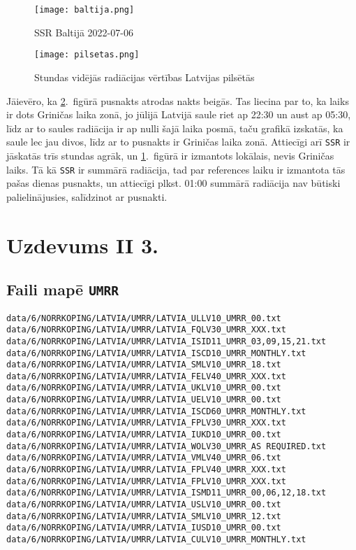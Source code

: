 \documentclass[12pt,a4paper]{article}
\begin{document}
\begin{figure}[ht!]
    \centering
    \texttt{[image: baltija.png]}
    \caption{SSR Baltijā 2022-07-06}
    \label{baltija}
\end{figure}
\begin{figure}[ht!]
    \centering
    \texttt{[image: pilsetas.png]}
    \caption{Stundas vidējās radiācijas vērtības Latvijas pilsētās}
    \label{pilsetas}
\end{figure}
Jāievēro, ka \ref{pilsetas}.~figūrā pusnakts atrodas nakts beigās. Tas liecina par to, ka laiks ir dots Griničas laika zonā, jo jūlijā Latvijā saule riet ap 22:30 un aust ap 05:30, līdz ar to saules radiācija ir ap nulli šajā laika posmā, taču grafikā izskatās, ka saule lec jau divos, līdz ar to pusnakts ir Griničas laika zonā. Attiecīgi arī \texttt{SSR} ir jāskatās trīs stundas agrāk, un \ref{baltija}.~figūrā ir izmantots lokālais, nevis Griničas laiks. Tā kā \texttt{SSR} ir summārā radiācija, tad par references laiku ir izmantota tās pašas dienas pusnakts, un attiecīgi plkst. 01:00 summārā radiācija nav būtiski palielinājusies, salīdzinot ar pusnakti.


\newpage
\appendix
\section{Uzdevums II 3.}\label{ap:II 3}
\subsection*{Faili mapē \texttt{UMRR}}
\begin{lstlisting}[breaklines]
data/6/NORRKOPING/LATVIA/UMRR/LATVIA_ULLV10_UMRR_00.txt
data/6/NORRKOPING/LATVIA/UMRR/LATVIA_FQLV30_UMRR_XXX.txt
data/6/NORRKOPING/LATVIA/UMRR/LATVIA_ISID11_UMRR_03,09,15,21.txt
data/6/NORRKOPING/LATVIA/UMRR/LATVIA_ISCD10_UMRR_MONTHLY.txt
data/6/NORRKOPING/LATVIA/UMRR/LATVIA_SMLV10_UMRR_18.txt
data/6/NORRKOPING/LATVIA/UMRR/LATVIA_FELV40_UMRR_XXX.txt
data/6/NORRKOPING/LATVIA/UMRR/LATVIA_UKLV10_UMRR_00.txt
data/6/NORRKOPING/LATVIA/UMRR/LATVIA_UELV10_UMRR_00.txt
data/6/NORRKOPING/LATVIA/UMRR/LATVIA_ISCD60_UMRR_MONTHLY.txt
data/6/NORRKOPING/LATVIA/UMRR/LATVIA_FPLV30_UMRR_XXX.txt
data/6/NORRKOPING/LATVIA/UMRR/LATVIA_IUKD10_UMRR_00.txt
data/6/NORRKOPING/LATVIA/UMRR/LATVIA_WOLV30_UMRR_AS REQUIRED.txt
data/6/NORRKOPING/LATVIA/UMRR/LATVIA_VMLV40_UMRR_06.txt
data/6/NORRKOPING/LATVIA/UMRR/LATVIA_FPLV40_UMRR_XXX.txt
data/6/NORRKOPING/LATVIA/UMRR/LATVIA_FPLV10_UMRR_XXX.txt
data/6/NORRKOPING/LATVIA/UMRR/LATVIA_ISMD11_UMRR_00,06,12,18.txt
data/6/NORRKOPING/LATVIA/UMRR/LATVIA_USLV10_UMRR_00.txt
data/6/NORRKOPING/LATVIA/UMRR/LATVIA_SMLV10_UMRR_12.txt
data/6/NORRKOPING/LATVIA/UMRR/LATVIA_IUSD10_UMRR_00.txt
data/6/NORRKOPING/LATVIA/UMRR/LATVIA_CULV10_UMRR_MONTHLY.txt
\end{lstlisting}
\end{document}

